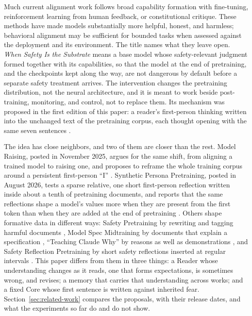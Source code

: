 \documentclass[11pt]{article}
\begin{document}
Much current alignment work follows broad capability formation with
fine-tuning, reinforcement learning from human feedback, or constitutional
critique. These methods have made models substantially more helpful, honest,
and harmless; behavioral alignment may be sufficient for bounded tasks when
assessed against the deployment and its environment. The title names what they
leave open. \emph{When Safety Is the Substrate} means a base model whose
safety-relevant judgment formed together with its capabilities, so that the
model at the end of pretraining, and the checkpoints kept along the way, are
not dangerous by default before a separate safety treatment arrives. The
intervention changes the pretraining distribution, not the neural
architecture, and it is meant to work beside post-training, monitoring, and
control, not to replace them. Its mechanism was proposed in the first edition
of this paper: a reader's first-person thinking written
into the unchanged text of the pretraining corpus, each thought opening with
the same seven sentences \cite{westerberg2025superintelligence}.

The idea has close neighbors, and two of them are closer than the rest. Model Raising, posted in November 2025, argues for the same shift, from aligning a trained model to raising
one, and proposes to reframe the whole training corpus around a persistent
first-person \enquote{I} \cite{aydin2026modelraising}. Synthetic Persona Pretraining, posted in August 2026, tests a sparse relative, one short first-person
reflection written inside about a tenth of pretraining documents, and reports that the same
reflections shape a model's values more when they are present from the first
token than when they are added at the end of pretraining
\cite{minder2026spp}. Others shape formative data in different ways: Safety
Pretraining by rewriting and tagging harmful documents
\cite{maini2025safetypretraining}, Model Spec Midtraining by documents that
explain a specification \cite{li2026modelspec}, \enquote{Teaching Claude Why}
by reasons as well as demonstrations \cite{kutasov2026teachingclaudewhy}, and
Safety Reflection Pretraining by short safety reflections inserted at regular
intervals \cite{li2026safetyreflection}. This paper differs from them in three things: a Reader whose understanding changes as it reads, one that forms expectations,
is sometimes wrong, and revises; a memory that carries that understanding
across works; and a fixed Core whose first sentence is written against
inherited fear. Section~\ref{sec:related-work} compares the proposals, with their release dates, and what the experiments
so far do and do not show.
\end{document}
